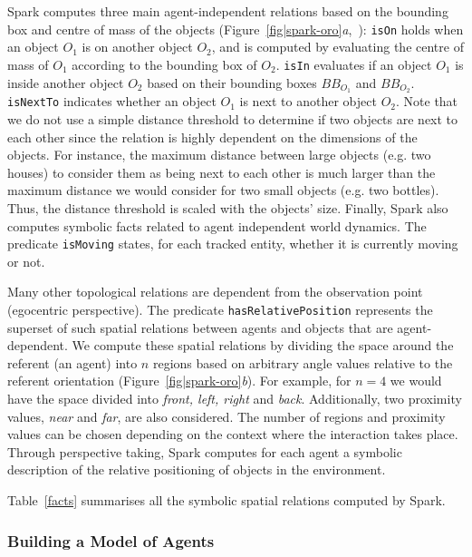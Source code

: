\documentclass[preprint,3p,times]{elsarticle}
\newcommand{\concept}[1]{{\small \texttt{#1}}}
\newcommand{\eg}{e.g.\xspace}
\begin{document}
{\sc Spark} computes three main agent-independent relations
based on the bounding box and centre of mass of the objects
(Figure~\ref{fig|spark-oro}\emph{a},~\cite{Sisbot2011}): \concept{isOn} holds when an object $O_1$
is on another object $O_2$, and is computed by evaluating the centre of mass of
$O_1$ according to the bounding box of $O_2$.  \concept{isIn} evaluates if an
object $O_1$ is inside another object $O_2$ based on their bounding boxes
$BB_{O_1}$ and $BB_{O_2}$.  \concept{isNextTo} indicates whether an object $O_1$
is next to another object $O_2$. Note that we do not use a simple distance threshold to
determine if two objects are next to each other since the relation is highly
dependent on the dimensions of the objects. For instance, the maximum distance
between large objects (\eg two houses) to consider them as being next to each
other is much larger than the maximum distance we would consider for two small
objects (\eg two bottles). Thus, the distance threshold is scaled with the
objects' size. Finally, {\sc Spark} also computes symbolic facts related to agent
independent world dynamics.  The predicate \concept{isMoving} states, for each
tracked entity, whether it is currently moving or not.

Many other topological relations are dependent from the observation point
(egocentric perspective).  The predicate \concept{hasRelativePosition}
represents the superset of such spatial relations between agents and objects
that are agent-dependent. We compute these spatial relations by dividing the space around the
referent (an agent) into $n$ regions based on arbitrary angle values relative to
the referent orientation (Figure~\ref{fig|spark-oro}\emph{b}).  For example, for
$n = 4$ we would have the space divided into \emph{front, left, right} and
\emph{back}. Additionally, two proximity values, \emph{near} and \emph{far}, are
also considered. The number of regions and proximity values can be chosen
depending on the context where the interaction takes place.
Through perspective taking, {\sc Spark} computes for each agent a symbolic
description of the relative positioning of objects in the environment.

Table~\ref{facts} summarises all the symbolic spatial relations computed by {\sc
Spark}.

\subsubsection{Building a Model of Agents}
\label{sect|grounding_agents}
\end{document}
